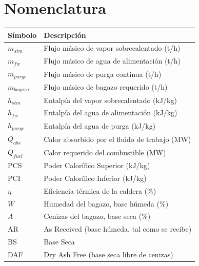 \section*{Nomenclatura}

\begin{tabular}{@{}ll@{}}
	\toprule
	\textbf{Símbolo} & \textbf{Descripción} \\
	\midrule
	$m_{stm}$ & Flujo másico de vapor sobrecalentado (t/h) \\
	$m_{fw}$ & Flujo másico de agua de alimentación (t/h) \\
	$m_{purge}$ & Flujo másico de purga continua (t/h) \\
	$m_{bagazo}$ & Flujo másico de bagazo requerido (t/h) \\
	$h_{stm}$ & Entalpía del vapor sobrecalentado (kJ/kg) \\
	$h_{fw}$ & Entalpía del agua de alimentación (kJ/kg) \\
	$h_{purge}$ & Entalpía del agua de purga (kJ/kg) \\
	$Q_{abs}$ & Calor absorbido por el fluido de trabajo (MW) \\
	$Q_{fuel}$ & Calor requerido del combustible (MW) \\
	PCS & Poder Calorífico Superior (kJ/kg) \\
	PCI & Poder Calorífico Inferior (kJ/kg) \\
	$\eta$ & Eficiencia térmica de la caldera (\%) \\
	$W$ & Humedad del bagazo, base húmeda (\%) \\
	$A$ & Cenizas del bagazo, base seca (\%) \\
	AR & As Received (base húmeda, tal como se recibe) \\
	BS & Base Seca \\
	DAF & Dry Ash Free (base seca libre de cenizas) \\
	\bottomrule
\end{tabular}

\newpage
